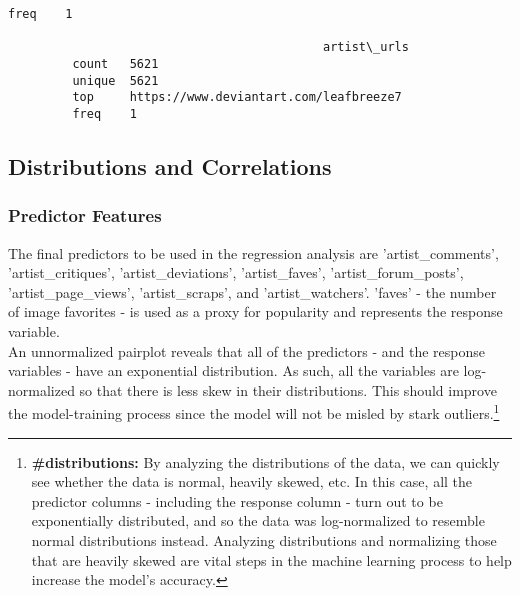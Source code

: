 \documentclass[11pt]{article}
\begin{document}
\begin{Verbatim}[commandchars=\\\{\}]
         freq    1                                                                                                                                                                                                                                                                                                                                                                                                                                                                                                                                                                                                                                                                                                                         
         
                                            artist\_urls  
         count   5621                                    
         unique  5621                                    
         top     https://www.deviantart.com/leafbreeze7  
         freq    1                                       
\end{Verbatim}
                        \newpage
    \subsection{Distributions and Correlations}

\subsubsection{Predictor Features}

The final predictors to be used in the regression analysis are
'artist\_comments', 'artist\_critiques', 'artist\_deviations',
'artist\_faves', 'artist\_forum\_posts', 'artist\_page\_views',
'artist\_scraps', and 'artist\_watchers'. 'faves' - the number of image
favorites - is used as a proxy for popularity and represents the
response variable.\\

An unnormalized pairplot reveals that all of the predictors - and the
response variables - have an exponential distribution. As such, all the
variables are log-normalized so that there is less skew in their
distributions. This should improve the model-training process since the
model will not be misled by stark outliers.\footnote{\textbf{\#distributions:} By analyzing the distributions of the data, we can quickly see whether the data is normal, heavily skewed, etc. In this case, all the predictor columns - including the response column - turn out to be exponentially distributed, and so the data was log-normalized to resemble normal distributions instead. Analyzing distributions and normalizing those that are heavily skewed are vital steps in the machine learning process to help increase the model's accuracy.}\\
\end{document}
